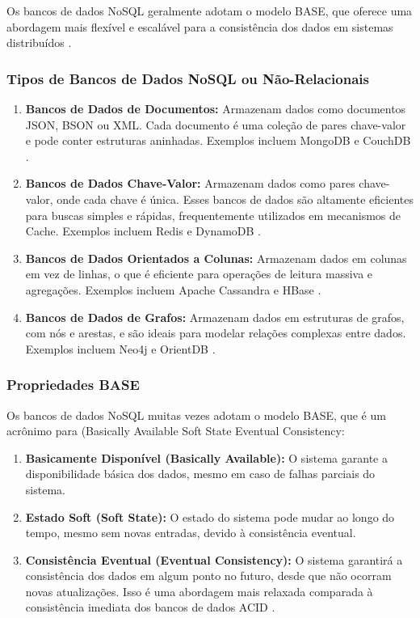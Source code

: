 Os bancos de dados NoSQL geralmente adotam o modelo BASE, que oferece uma abordagem mais flexível e escalável para a consistência dos dados em sistemas distribuídos \cite{brewer2000}.

\subsubsection{Tipos de Bancos de Dados NoSQL ou Não-Relacionais}

\begin{enumerate}
    \item \textbf{Bancos de Dados de Documentos:} Armazenam dados como documentos JSON, BSON ou XML. Cada documento é uma coleção de pares chave-valor e pode conter estruturas aninhadas. Exemplos incluem MongoDB e CouchDB \cite{chodorow2013}.
    \item \textbf{Bancos de Dados Chave-Valor:} Armazenam dados como pares chave-valor, onde cada chave é única. Esses bancos de dados são altamente eficientes para buscas simples e rápidas, frequentemente utilizados em mecanismos de Cache. Exemplos incluem Redis e DynamoDB \cite{decandia2007}.
    \item \textbf{Bancos de Dados Orientados a Colunas:} Armazenam dados em colunas em vez de linhas, o que é eficiente para operações de leitura massiva e agregações. Exemplos incluem Apache Cassandra e HBase \cite{lakshman2010}.
    \item \textbf{Bancos de Dados de Grafos:} Armazenam dados em estruturas de grafos, com nós e arestas, e são ideais para modelar relações complexas entre dados. Exemplos incluem Neo4j e OrientDB \cite{angles2008}.
\end{enumerate}

\subsubsection{Propriedades BASE}

Os bancos de dados NoSQL muitas vezes adotam o modelo BASE, que é um acrônimo para (Basically Available Soft State Eventual Consistency:

\begin{enumerate}
    \item \textbf{Basicamente Disponível (Basically Available):} O sistema garante a disponibilidade básica dos dados, mesmo em caso de falhas parciais do sistema.
    \item \textbf{Estado Soft (Soft State):} O estado do sistema pode mudar ao longo do tempo, mesmo sem novas entradas, devido à consistência eventual.
    \item \textbf{Consistência Eventual (Eventual Consistency):} O sistema garantirá a consistência dos dados em algum ponto no futuro, desde que não ocorram novas atualizações. Isso é uma abordagem mais relaxada comparada à consistência imediata dos bancos de dados ACID \cite{vogels2009}.
\end{enumerate}

